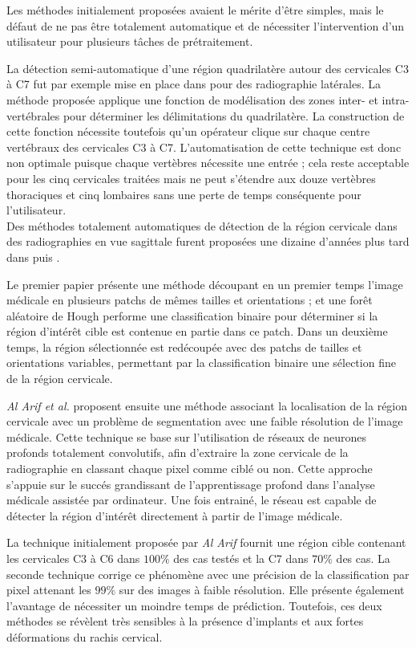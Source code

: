         Les méthodes initialement proposées avaient le mérite d'être simples, mais le défaut de ne pas être totalement automatique et de nécessiter l'intervention d'un utilisateur pour plusieurs tâches de prétraitement.

        La détection semi-automatique d'une région quadrilatère autour des cervicales C3 à C7 fut par exemple mise en place dans \cite{Benjelloun2006a} pour des radiographie latérales. La méthode proposée applique une fonction de modélisation des zones inter- et intra-vertébrales pour déterminer les délimitations du quadrilatère. La construction de cette fonction nécessite toutefois qu'un opérateur clique sur chaque centre vertébraux des cervicales C3 à C7. L'automatisation de cette technique est donc non optimale puisque chaque vertèbres nécessite une entrée ; cela reste acceptable pour les cinq cervicales traitées mais ne peut s'étendre aux douze vertèbres thoraciques et cinq lombaires sans une perte de temps conséquente pour l'utilisateur.
        \\

        Des méthodes totalement automatiques de détection de la région cervicale dans des radiographies en vue sagittale furent proposées une dizaine d'années plus tard dans \cite{AlArif2016a} puis \cite{AlArif2017a}.

        Le premier papier présente une méthode découpant en un premier temps l'image médicale en plusieurs patchs de mêmes tailles et orientations ; et une forêt aléatoire de Hough performe une classification binaire pour déterminer si la région d'intérêt cible est contenue en partie dans ce patch. Dans un deuxième temps, la région sélectionnée est redécoupée avec des patchs de tailles et orientations variables, permettant par la classification binaire une sélection fine de la région cervicale.

        {\itshape Al Arif et al.} proposent ensuite une méthode associant la localisation de la région cervicale avec un problème de segmentation avec une faible résolution de l'image médicale. Cette technique se base sur l'utilisation de réseaux de neurones profonds totalement convolutifs, afin d'extraire la zone cervicale de la radiographie en classant chaque pixel comme ciblé ou non. Cette approche s'appuie sur le succés grandissant de l'apprentissage profond dans l'analyse médicale assistée par ordinateur. Une fois entrainé, le réseau est capable de détecter la région d'intérêt directement à partir de l'image médicale.

        La technique initialement proposée par {\itshape Al Arif} fournit une région cible contenant les cervicales C3 à C6 dans $100\%$ des cas testés et la C7 dans $70\%$ des cas. La seconde technique corrige ce phénomène avec une précision de la classification par pixel attenant les $99\%$ sur des images à faible résolution. Elle présente également l'avantage de nécessiter un moindre temps de prédiction. Toutefois, ces deux méthodes se révèlent très sensibles à la présence d'implants et aux fortes déformations du rachis cervical.
        \\

